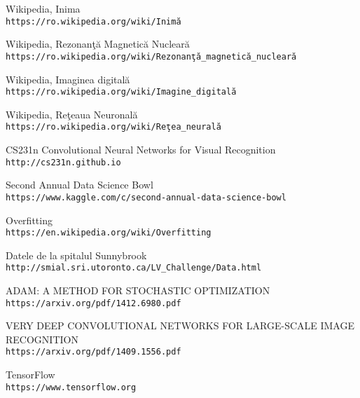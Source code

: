 \begin{thebibliography}{9} 

Wikipedia, Inima
\\\texttt{https://ro.wikipedia.org/wiki/Inim\u{a}}

Wikipedia, Rezonan\c{t}\u{a} Magnetic\u{a} Nuclear\u{a}
\\\texttt{https://ro.wikipedia.org/wiki/Rezonan\c{t}\u{a}\_magnetic\u{a}\_nuclear\u{a}}

Wikipedia, Imaginea digital\u{a}
\\\texttt{https://ro.wikipedia.org/wiki/Imagine\_digital\u{a}}

Wikipedia, Re\c{t}eaua Neuronal\u{a}
\\\texttt{https://ro.wikipedia.org/wiki/Re\c{t}ea\_neural\u{a}}

CS231n Convolutional Neural Networks for Visual Recognition
\\\texttt{http://cs231n.github.io}

Second Annual Data Science Bowl
\\\texttt{https://www.kaggle.com/c/second-annual-data-science-bowl}

Overfitting
\\\texttt{https://en.wikipedia.org/wiki/Overfitting}

Datele de la spitalul Sunnybrook
\\\texttt{http://smial.sri.utoronto.ca/LV\_Challenge/Data.html}

ADAM: A METHOD FOR STOCHASTIC OPTIMIZATION
\\\texttt{https://arxiv.org/pdf/1412.6980.pdf}

VERY DEEP CONVOLUTIONAL NETWORKS FOR LARGE-SCALE IMAGE RECOGNITION
\\\texttt{https://arxiv.org/pdf/1409.1556.pdf}

TensorFlow
\\\texttt{https://www.tensorflow.org}

\end{thebibliography}